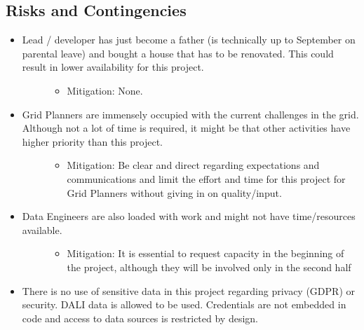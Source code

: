 \documentclass[letterpaper,10pt,english]{sphinxmanual}
\begin{document}
\subsection{Risks and Contingencies}
\label{\detokenize{business_understanding:risks-and-contingencies}}\begin{itemize}
\item {} \begin{description}
\item[{Lead / developer has just become a father (is technically up to September on parental leave) and bought a house that has to be renovated. This could result in lower availability for this project.}] \leavevmode\begin{itemize}
\item {} 
Mitigation: None.

\end{itemize}

\end{description}

\item {} \begin{description}
\item[{Grid Planners are immensely occupied with the current challenges in the grid. Although not a lot of time is required, it might be that other activities have higher priority than this project.}] \leavevmode\begin{itemize}
\item {} 
Mitigation: Be clear and direct regarding expectations and communications and limit the effort and time for this project for Grid Planners without giving in on quality/input.

\end{itemize}

\end{description}

\item {} \begin{description}
\item[{Data Engineers are also loaded with work and might not have time/resources available.}] \leavevmode\begin{itemize}
\item {} 
Mitigation: It is essential to request capacity in the beginning of the project, although they will be involved only in the second half

\end{itemize}

\end{description}

\item {} 
There is no use of sensitive data in this project regarding privacy (GDPR) or security. DALI data is allowed to be used. Credentials are not embedded in code and access to data sources is restricted by design.

\end{itemize}
\end{document}
